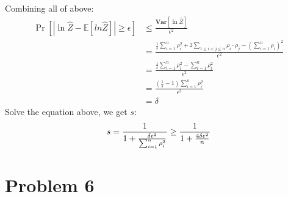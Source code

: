 \documentclass[a4paper, 12pt, titlepage]{article}
\begin{document}
Combining all of above:
\begin{equation}
    \begin{aligned}
        \Pr \left[ |\ln{\hat{Z}} - \mathbb E \left[ ln{\hat{Z}} \right] | \geq \epsilon \right] &\leq \frac{\mathbf{Var} \left[ \ln{\hat{Z}}\right] }{\epsilon^{2}} \\
                                                                                                &= \frac{\frac{1}{s} \sum_{i = 1}^{n} \rho_{i}^2 + 2 \sum_{1 \leq i < j \leq n} \rho_{i} \cdot \rho_{j} - \left( \sum_{i = 1}^{n} \rho_{i} \right)^2 }{\epsilon^2} \\
                                                                                                &= \frac{\frac{1}{s} \sum_{i = 1}^{n} \rho_{i}^2 - \sum_{i = 1}^{n} \rho_{i}^2}{\epsilon^2} \\
                                                                                                &= \frac{\left( \frac{1}{s} - 1 \right) \sum_{i = 1}^{n} \rho_{i}^2}{\epsilon^2} \\
                                                                                                &= \delta
    \end{aligned}
\end{equation}
Solve the equation above, we get $s$:
\[
    s = \frac{1}{1 + \frac{\delta \epsilon^2}{\sum_{i = 1}^{n} \rho_{i}^2}} \\
      \geq \frac{1}{1 + \frac{4 \delta \epsilon^2}{n}}
\]

\section{Problem 6}
\end{document}
